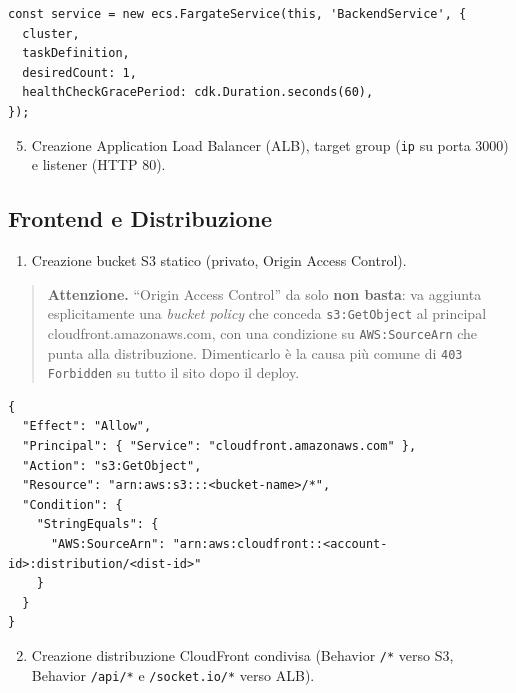 \documentclass[11pt,a4paper]{article}
\begin{document}
\begin{lstlisting}[caption={Grace period per evitare restart-loop in avvio}]
const service = new ecs.FargateService(this, 'BackendService', {
  cluster,
  taskDefinition,
  desiredCount: 1,
  healthCheckGracePeriod: cdk.Duration.seconds(60),
});
\end{lstlisting}

\begin{enumerate}
    \setcounter{enumi}{4}
    \item Creazione Application Load Balancer (ALB), target group (\texttt{ip} su porta 3000) e listener (HTTP 80).
\end{enumerate}

\subsection{Frontend e Distribuzione}

\begin{enumerate}
    \item Creazione bucket S3 statico (privato, Origin Access Control).
\end{enumerate}

\begin{quote}
\textbf{Attenzione.} ``Origin Access Control'' da solo \textbf{non basta}: va aggiunta esplicitamente una \emph{bucket policy} che conceda \texttt{s3:GetObject} al principal {\ttfamily cloudfront.\allowbreak{}amazonaws.com}, con una condizione su \texttt{AWS:SourceArn} che punta alla distribuzione. Dimenticarlo è la causa più comune di \texttt{403 Forbidden} su tutto il sito dopo il deploy.
\end{quote}

\begin{lstlisting}[caption={Bucket policy minima per accesso via OAC}]
{
  "Effect": "Allow",
  "Principal": { "Service": "cloudfront.amazonaws.com" },
  "Action": "s3:GetObject",
  "Resource": "arn:aws:s3:::<bucket-name>/*",
  "Condition": {
    "StringEquals": {
      "AWS:SourceArn": "arn:aws:cloudfront::<account-id>:distribution/<dist-id>"
    }
  }
}
\end{lstlisting}

\begin{enumerate}
    \setcounter{enumi}{1}
    \item Creazione distribuzione CloudFront condivisa (Behavior \texttt{/*} verso S3, Behavior \texttt{/api/*} e \texttt{/socket.io/*} verso ALB).
\end{enumerate}
\end{document}
